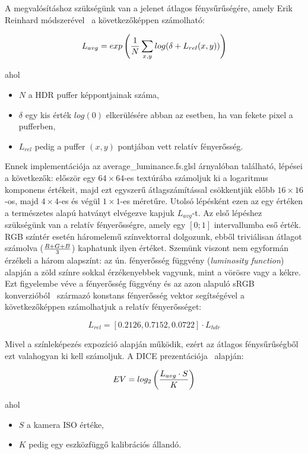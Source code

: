 A megvalósításhoz szükségünk van a jelenet átlagos fénysűrűségére, amely Erik Reinhard módszerével~\cite{reinhard2002photographic} a következőképpen számolható:

\[
L_{avg} = exp\left( { 1 \over N } \displaystyle\sum_{x, y} log(\delta + L_{rel}(x, y)) \right)
\]

\noindent
ahol

\begin{itemize}[noitemsep]
\item \(N\) a HDR puffer képpontjainak száma,
\item \(\delta\) egy kis érték \(log(0)\) elkerülésére abban az esetben, ha van fekete pixel a pufferben,
\item \(L_{rel}\) pedig a puffer \((x, y)\) pontjában vett relatív fényerősség.
\end{itemize}

Ennek implementációja az average\_luminance.fs.glsl árnyalóban található, lépései a következők: először egy \(64 \times 64\)-es textúrába számoljuk ki a logaritmus komponens értékeit, majd ezt egyszerű átlagszámítással csökkentjük előbb \(16 \times 16\)-os, majd \(4 \times 4\)-es és végül \(1 \times 1\)-es méretűre. Utolsó lépésként ezen az egy értéken a természetes alapú hatványt elvégezve kapjuk \(L_{avg}\)-t. Az első lépéshez szükségünk van a relatív fényerősségre, amely egy \([0; 1]\) intervallumba eső érték. RGB színtér esetén háromelemű színvektorral dolgozunk, ebből triviálisan átlagot számolva (\( { R + G + B } \over 3 \)) kaphatunk ilyen értéket. Szemünk viszont nem egyformán érzékeli a három alapszínt: az ún. fényerősség függvény (\textit{luminosity function}) alapján a zöld színre sokkal érzékenyebbek vagyunk, mint a vörösre vagy a kékre. Ezt figyelembe véve a fényerősség függvény és az azon alapuló sRGB konverzióból~\cite{stokes2012standard} származó konstans fényerősség vektor segítségével a következőképpen számolhatjuk a relatív fényerősséget:

\[
L_{rel} = [0.2126, 0.7152, 0.0722] \cdot L_{hdr}
\]

Mivel a színleképezés expozíció alapján működik, ezért az átlagos fénysűrűségből ezt valahogyan ki kell számoljuk. A DICE prezentációja~\cite{dice_moving_frostbite_to_pbr} alapján:

\[
EV = log_2\left({ L_{avg} \cdot S } \over K\right)
\]

\noindent
ahol

\begin{itemize}[noitemsep]
\item \(S\) a kamera ISO értéke,
\item \(K\) pedig egy eszközfüggő kalibrációs állandó.
\end{itemize}

